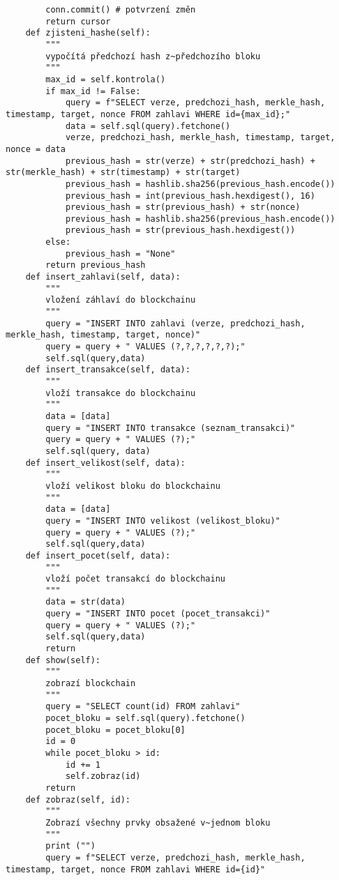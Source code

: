 \documentclass[12pt]{report}			%
\begin{document}
{\begin{appendices}
\begin{lstlisting}
        conn.commit() # potvrzení změn
        return cursor
    def zjisteni_hashe(self):
        """
        vypočítá předchozí hash z~předchozího bloku
        """
        max_id = self.kontrola()
        if max_id != False:
            query = f"SELECT verze, predchozi_hash, merkle_hash, timestamp, target, nonce FROM zahlavi WHERE id={max_id};"
            data = self.sql(query).fetchone()
            verze, predchozi_hash, merkle_hash, timestamp, target, nonce = data
            previous_hash = str(verze) + str(predchozi_hash) + str(merkle_hash) + str(timestamp) + str(target)
            previous_hash = hashlib.sha256(previous_hash.encode())
            previous_hash = int(previous_hash.hexdigest(), 16)
            previous_hash = str(previous_hash) + str(nonce)
            previous_hash = hashlib.sha256(previous_hash.encode())
            previous_hash = str(previous_hash.hexdigest())
        else: 
            previous_hash = "None"
        return previous_hash
    def insert_zahlavi(self, data):
        """
        vložení záhlaví do blockchainu
        """
        query = "INSERT INTO zahlavi (verze, predchozi_hash, merkle_hash, timestamp, target, nonce)"         
        query = query + " VALUES (?,?,?,?,?,?);"
        self.sql(query,data)
    def insert_transakce(self, data):
        """
        vloží transakce do blockchainu
        """    
        data = [data]
        query = "INSERT INTO transakce (seznam_transakci)" 
        query = query + " VALUES (?);"
        self.sql(query, data)
    def insert_velikost(self, data):
        """
        vloží velikost bloku do blockchainu
        """ 
        data = [data]
        query = "INSERT INTO velikost (velikost_bloku)" 
        query = query + " VALUES (?);"
        self.sql(query,data)
    def insert_pocet(self, data):
        """
        vloží počet transakcí do blockchainu
        """   
        data = str(data)
        query = "INSERT INTO pocet (pocet_transakci)" 
        query = query + " VALUES (?);"
        self.sql(query,data)
        return
    def show(self):
        """
        zobrazí blockchain
        """
        query = "SELECT count(id) FROM zahlavi"
        pocet_bloku = self.sql(query).fetchone()
        pocet_bloku = pocet_bloku[0]
        id = 0
        while pocet_bloku > id:
            id += 1
            self.zobraz(id)
        return 
    def zobraz(self, id):
        """
        Zobrazí všechny prvky obsažené v~jednom bloku
        """
        print ("")
        query = f"SELECT verze, predchozi_hash, merkle_hash, timestamp, target, nonce FROM zahlavi WHERE id={id}" 

\end{lstlisting}
\end{appendices}}
\end{document}
